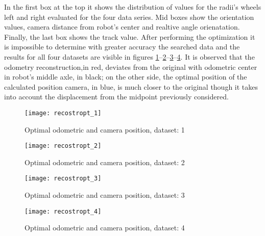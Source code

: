 In the first box at the top it shows the distribution of values for the radii's wheels left and right evaluated for the four data series.
Mid boxes show the orientation values, camera distance from robot's center and realtive angle orienatation.
Finally, the last box shows the track value.
After performing the optimization it is impossible to determine with greater accuracy the searched data and the results for all four datasets are visible in figures \ref{fig:OptiOdo1}--\ref{fig:OptiOdo2}--\ref{fig:OptiOdo3}--\ref{fig:OptiOdo4}.
It is observed that the odometry reconstruction,in red, deviates from the original with odometric center in robot's middle axle, in black; on the other side, the optimal position of the calculated position camera, in blue, is much closer to the original though it takes into account the displacement from the midpoint previously considered.
\begin{figure}[htb]
   {\texttt{[image: recostropt\_1]}}
   \caption{Optimal odometric and camera position, dataset: 1}
   \label{fig:OptiOdo1}
\end{figure}

\begin{figure}[h]
   {\texttt{[image: recostropt\_2]}}
   \caption{Optimal odometric and camera position, dataset: 2}
   \label{fig:OptiOdo2}
\end{figure}

\begin{figure}[h]
   {\texttt{[image: recostropt\_3]}} 
   \caption{Optimal odometric and camera position, dataset: 3}
   \label{fig:OptiOdo3}
\end{figure}

\begin{figure}[h]
   {\texttt{[image: recostropt\_4]}}
\caption{Optimal odometric and camera position, dataset: 4}
\label{fig:OptiOdo4}
\end{figure}
